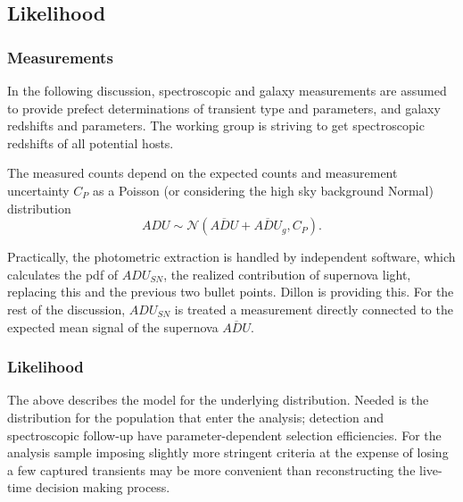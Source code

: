 \documentclass[preprint,3p]{elsarticle}
\begin{document}
\subsection{Likelihood}

\subsubsection{Measurements}
In the following discussion,
spectroscopic and galaxy measurements are assumed
to provide prefect determinations of transient type and parameters, and
galaxy redshifts and parameters.  The working group is striving to get spectroscopic
redshifts of all potential hosts.

The measured counts depend on the expected counts and measurement uncertainty
$C_P$ as a Poisson (or considering the high sky background Normal) distribution
\begin{equation}
\mathit{ADU} \sim \mathcal{N} (\overline{\mathit{ADU}}+\overline{\mathit{ADU}}_g ,C_P).
\label{ADU:eqn}
\end{equation}


Practically, the photometric extraction is handled by independent software, which calculates
the pdf of $\mathit{ADU}_{\mathit{SN}}$, the realized contribution of supernova light,
replacing this and the previous two bullet points.  Dillon is providing this.
For the rest of the discussion, $\mathit{ADU}_{\mathit{SN}}$ is treated a measurement
directly connected to the expected mean signal of the supernova
$\overline{\mathit{ADU}}$.

\subsubsection{Likelihood}


The above describes the model for the underlying distribution.  Needed
is the distribution for the population that enter the analysis; detection and spectroscopic
follow-up have parameter-dependent selection efficiencies.  For the analysis sample
imposing slightly more stringent criteria at the expense
of losing a few captured transients may be more convenient than reconstructing
the live-time decision making process.

\end{document}
